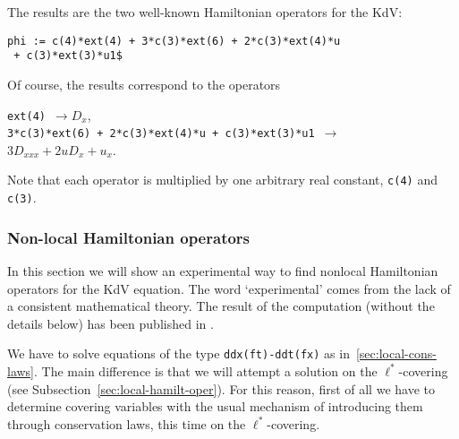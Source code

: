 The results are the two well-known Hamiltonian operators for the KdV:
\begin{verbatim}
phi := c(4)*ext(4) + 3*c(3)*ext(6) + 2*c(3)*ext(4)*u
 + c(3)*ext(3)*u1$
\end{verbatim}
Of course, the results correspond to the operators
\begin{center}
  \texttt{ext(4)}\ $\to D_x$,\\
  \texttt{3*c(3)*ext(6) +
  2*c(3)*ext(4)*u + c(3)*ext(3)*u1}\ $\to$ \\
 $3D_{xxx} + 2uD_{x} + u_x$.
\end{center}
Note that each operator is multiplied by one arbitrary real
constant, \texttt{c(4)} and \texttt{c(3)}.

\subsubsection{Non-local Hamiltonian operators}
\label{sec:non-local-hamilt}

In this section we will show an experimental way to find nonlocal Hamiltonian
operators for the KdV equation. The word `experimental' comes from the lack of
a consistent mathematical theory. The result of the computation (without the
details below) has been published in \cite{KerstenKrasilshchikVerboretsky:2004}.

We have to solve equations of the type \texttt{ddx(ft)-ddt(fx)} as
in~\ref{sec:local-cons-laws}. The main difference is that we will attempt a
solution on the $\ell^*$-covering (see Subsection~\ref{sec:local-hamilt-oper}).
For this reason, first of all we have to determine covering variables with the
usual mechanism of introducing them through conservation laws, this time on the
$\ell^*$-covering.

